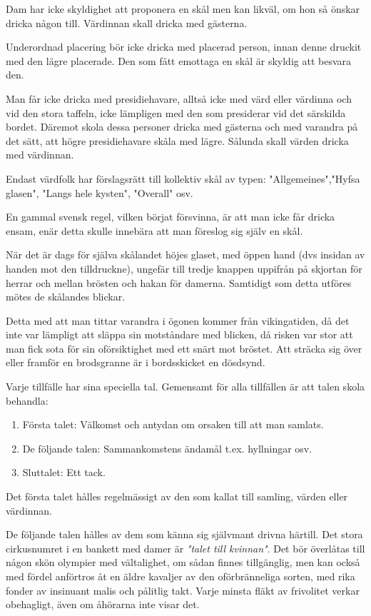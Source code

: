 Dam har icke skyldighet att proponera en skål men kan likväl, om hon så önskar dricka någon till. Värdinnan skall dricka med gästerna.

Underordnad placering bör icke dricka med placerad person, innan denne druckit med den lägre placerade. Den som fått emottaga en skål är skyldig att besvara den.

Man får icke dricka med presidiehavare, alltså icke med värd eller värdinna och vid den stora taffeln, icke lämpligen med den som presiderar vid det särskilda bordet. Däremot skola dessa personer dricka med gästerna och med varandra på det sätt, att högre presidiehavare skåla med lägre. Sålunda skall värden dricka med värdinnan.

Endast värdfolk har förslagsrätt till kollektiv skål av typen: "Allgemeines","Hyfsa glasen", "Langs hele kysten", "Overall" osv.

En gammal svensk regel, vilken börjat försvinna, är att man icke får dricka ensam, enär detta skulle innebära att man föreslog sig själv en skål.

När det är dags för själva skålandet höjes glaset, med öppen hand (dvs insidan av handen mot den tilldruckne), ungefär till tredje knappen uppifrån på skjortan för herrar och mellan brösten och hakan för damerna. Samtidigt som detta utföres mötes de skålandes blickar.

Detta med att man tittar varandra i ögonen kommer från vikingatiden, då det inte var lämpligt att släppa sin motståndare med blicken, då risken var stor att man fick sota för sin oförsiktighet med ett snärt mot bröstet. Att sträcka sig över eller framför en brodsgranne är i bordsskicket en dösdsynd.


Varje tillfälle har sina speciella tal. Gemensamt för alla tillfällen är att talen skola behandla:
\begin{enumerate}
    \item Första talet: Välkomst och antydan om orsaken till att man samlats.
    \item De följande talen: Sammankomstens ändamål t.ex. hyllningar osv.
    \item Sluttalet: Ett tack.
\end{enumerate}

Det första talet hålles regelmässigt av den som kallat till samling, värden eller värdinnan.

De följande talen hålles av dem som känna sig självmant drivna härtill. Det stora cirkusnumret i en bankett med damer är \textit{"talet till kvinnan"}. Det bör överlåtas till någon skön olympier med vältalighet, om sådan finnes tillgänglig, men kan också med fördel anförtros åt en äldre kavaljer av den oförbränneliga sorten, med rika fonder av insinuant malis och pålitlig takt. Varje minsta fläkt av frivolitet verkar obehagligt, även om åhörarna inte visar det.


